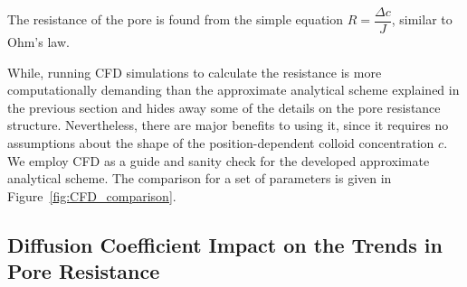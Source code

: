 \documentclass[10pt, a4paper]{article}
\begin{document}
\begin{multicols}{2}
The resistance of the pore is found from the simple equation $R = \dfrac{\Delta c}{J}$, similar to Ohm's law.

While, running CFD simulations to calculate the resistance is more computationally demanding than the approximate analytical scheme explained in the previous section and hides away some of the details on the pore resistance structure.
Nevertheless, there are major benefits to using it, since it requires no assumptions about the shape of the position-dependent colloid concentration $c$.
We employ CFD as a guide and sanity check for the developed approximate analytical scheme.
The comparison for a set of parameters is given in Figure~\ref{fig:CFD_comparison}.

\end{multicols}
\subsection*{Diffusion Coefficient Impact on the Trends in Pore Resistance}
\end{document}
